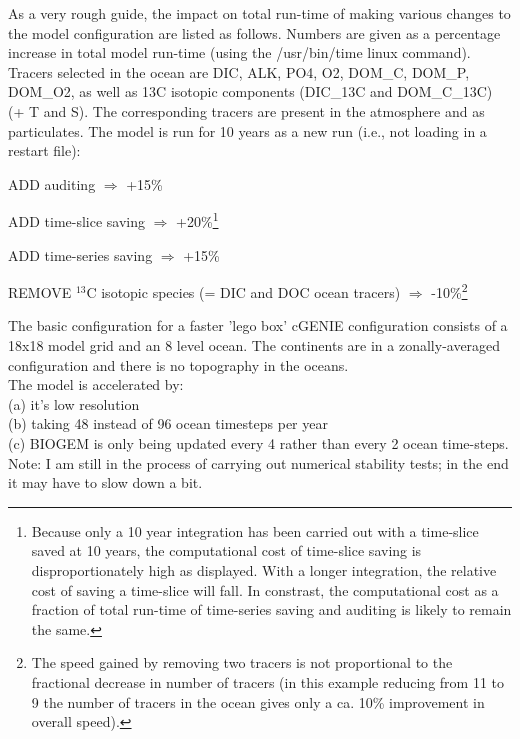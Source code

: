 \documentclass[10pt,twoside]{article}
\begin{document}
As a very rough guide, the impact on total run-time of making various changes to the model configuration are listed as follows. Numbers are given as a percentage increase in total model run-time (using the /usr/bin/time linux command). Tracers selected in the ocean are DIC, ALK, PO4, O2, DOM\_C, DOM\_P, DOM\_O2, as well as 13C isotopic components (DIC\_13C and DOM\_C\_13C) (+ T and S). The corresponding tracers are present in the atmosphere and as particulates. The model is run for 10 years as a new run (i.e., not loading in a restart file):

\begin{compactitem}
	\item	ADD auditing \begin{math}\Rightarrow\end{math} +15\%
	\item	ADD time-slice saving	\begin{math}\Rightarrow\end{math} +20\%\footnote{Because only a 10 year integration has been carried out with a time-slice saved at 10 years, the computational cost of time-slice saving is disproportionately high as displayed. With a longer integration, the relative cost of saving a time-slice will fall. In constrast, the computational cost as a fraction of total run-time of time-series saving and auditing is likely to remain the same.}
	\item	ADD time-series saving	\begin{math}\Rightarrow\end{math} +15\%
	\item	REMOVE \begin{math}^{13}\end{math}C isotopic species (= DIC and DOC ocean tracers) \begin{math}\Rightarrow\end{math} -10\%\footnote{The speed gained by removing two tracers is not proportional to the fractional decrease in number of tracers (in this example reducing from 11 to 9 the number of tracers in the ocean gives only a ca. 10\% improvement in overall speed).}
\end{compactitem}

The basic configuration for a faster 'lego box' cGENIE configuration consists of a 18x18 model grid and an 8 level ocean. The continents are in a zonally-averaged configuration and there is no topography in the oceans.
\\
The model is accelerated by:\\
(a) it's low resolution\\
(b) taking 48 instead of 96 ocean timesteps per year \\
(c) BIOGEM is only being updated every 4 rather than every 2 ocean time-steps.
\\
Note: I am still in the process of carrying out numerical stability tests; in the end it may have to slow down a bit.
\end{document}
